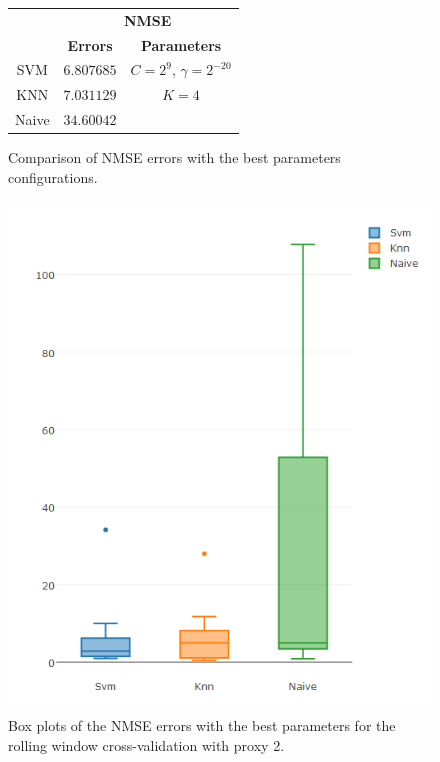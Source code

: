 \begin{figure}[!h]
\centering
\begin{tabular}{|c|c|c|}
   \hline
   & \multicolumn{2}{|c|}{\textbf{NMSE}} \\ \cline{2-3}
   & \textbf{Errors} & \textbf{Parameters}          \\ \hline
   SVM  & $6.807685$        & $C = 2^9$, $\gamma = 2^{-20}$          \\ 
   KNN & $7.031129$ & $K = 4$ \\ 
   Naive & $34.60042$ &      \\ 
   \hline
   \end{tabular}
\caption{Comparison of NMSE errors with the best parameters configurations.}
\label{fig:table6mNMSEp2}
\centering
\includegraphics[width=\linewidth]{img/6mproxy2NMSE.png}
\caption{Box plots of the NMSE errors with the best parameters for the rolling window cross-validation with proxy 2.}
\end{figure}


